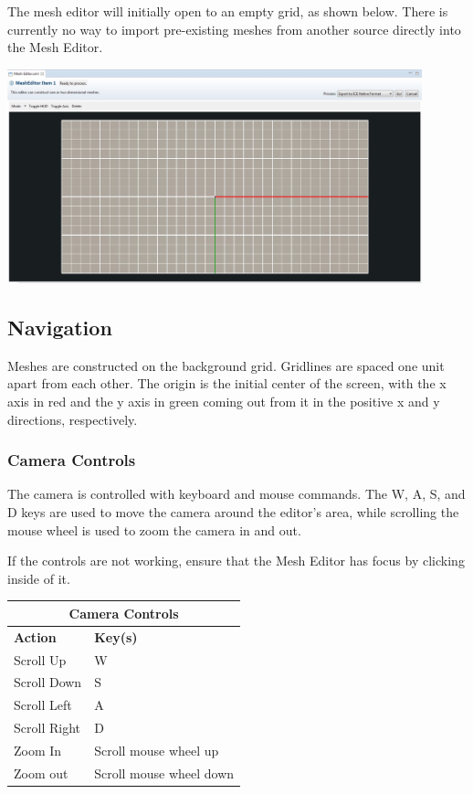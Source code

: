 \documentclass{article}
\begin{document}
The mesh editor will initially open to an empty grid, as shown below. There is
currently no way to import pre-existing meshes from another source directly
into the Mesh Editor.

\begin{center}
\includegraphics[width=12cm]{images/EmptyMeshEditor.jpg}
\end{center}

\subsection{Navigation}

Meshes are constructed on the background grid. Gridlines are spaced one unit
apart from each other. The origin is the initial center of the screen, with the
x axis in red and the y axis in green coming out from it in the positive x and y
directions, respectively. 

\subsubsection{Camera Controls}

The camera is controlled with keyboard and mouse commands. The W, A, S, and D
keys are used to move the camera around the editor's area, while scrolling the
mouse wheel is used to zoom the camera in and out. 

If the controls are not working, ensure that the Mesh Editor has focus by
clicking inside of it.

\begin{center}
    \begin{tabular}{| l | l |}
    \hline
    \multicolumn{2}{|c|}{\textbf{Camera Controls}} \\
  	\hline
    \textbf{Action} & \textbf{Key(s)} \\ \hline
    Scroll Up & W \\ \hline
    Scroll Down & S \\ \hline
    Scroll Left & A \\ \hline
    Scroll Right & D \\ \hline
    Zoom In & Scroll mouse wheel up \\ \hline
    Zoom out & Scroll mouse wheel down \\
    \hline
    \end{tabular}
\end{center}
\end{document}
